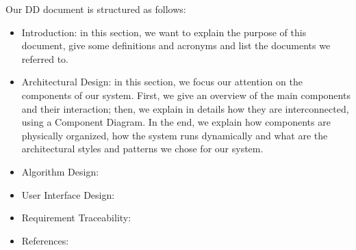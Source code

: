 Our DD document is structured as follows:
\begin{itemize}
    \item Introduction: in this section, we want to explain the purpose of this document, give some definitions and acronyms and list the documents we referred to. 
    \item Architectural Design: in this section, we focus our attention on the components of our system. First, we give an overview of the main components and their interaction; then, we explain in details how they are interconnected, using a Component Diagram.
    In the end, we explain how components are physically organized, how the system runs dynamically and what are the architectural styles and patterns we chose for our system.
    \item Algorithm Design:
    \item User Interface Design:
    \item Requirement Traceability:
    \item References:
\end{itemize}